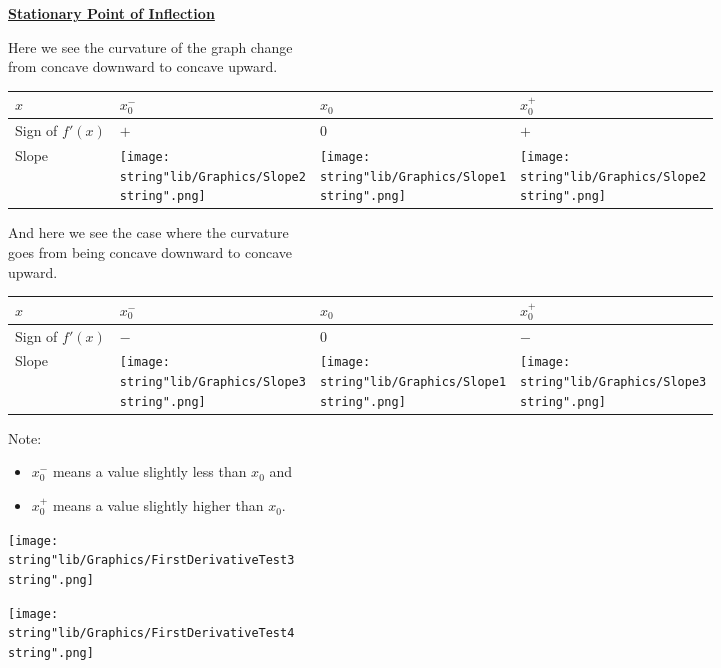 \documentclass[11pt,a4paper]{book}
\begin{document}
\begin{minipage}[t]{0.6\textwidth}

\textbf{\uline{Stationary Point of Inflection}}

\medskip

Here we see the curvature of the graph change\\
from concave downward to concave upward.

\setlength{\extrarowheight}{2pt}%
\begin{tabular}[t]{|>{\centering}m{1.8cm}|>{\centering}m{1.3cm}|>{\centering}m{1.3cm}|>{\centering}m{1.3cm}|}
\hline
$x$ & $x_{0}^{-}$ & $x_{0}$ & $x_{0}^{+}$\tabularnewline
\hline
Sign of $f'(x)$ & $+$ & $0$ & $+$\tabularnewline
\hline
Slope & \texttt{[image: \\string"lib/Graphics/Slope2\\string".png]} & \texttt{[image: \\string"lib/Graphics/Slope1\\string".png]} & \texttt{[image: \\string"lib/Graphics/Slope2\\string".png]}\tabularnewline
\hline
\end{tabular}

\vspace{2cm}

And here we see the case where the curvature \\
goes from being concave downward to concave \\
upward.

\setlength{\extrarowheight}{2pt}%
\begin{tabular}[t]{|>{\centering}m{1.8cm}|>{\centering}m{1.3cm}|>{\centering}m{1.3cm}|>{\centering}m{1.3cm}|}
\hline
$x$ & $x_{0}^{-}$ & $x_{0}$ & $x_{0}^{+}$\tabularnewline
\hline
Sign of $f'(x)$ & $-$ & $0$ & $-$\tabularnewline
\hline
Slope & \texttt{[image: \\string"lib/Graphics/Slope3\\string".png]} & \texttt{[image: \\string"lib/Graphics/Slope1\\string".png]} & \texttt{[image: \\string"lib/Graphics/Slope3\\string".png]}\tabularnewline
\hline
\end{tabular}

\vspace{0.5cm}

Note:
\begin{itemize}
\item $x_{0}^{-}$ means a value slightly less than $x_{0}$ and
\item $x_{0}^{+}$ means a value slightly higher than $x_{0}$.
\end{itemize}
\end{minipage}
\begin{minipage}[t]{0.4\textwidth}
\begin{center}
\texttt{[image: \\string"lib/Graphics/FirstDerivativeTest3\\string".png]}
\par\end{center}

\begin{center}
\texttt{[image: \\string"lib/Graphics/FirstDerivativeTest4\\string".png]}
\par\end{center}

\end{minipage}
\end{document}
